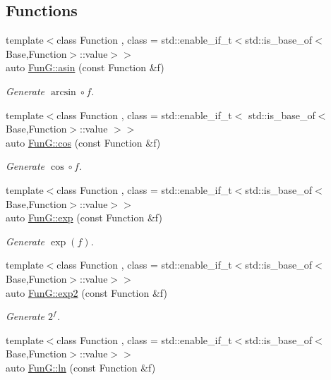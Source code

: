\subsection*{Functions}
\begin{DoxyCompactItemize}
\item 
{\footnotesize template$<$class Function , class  = std\+::enable\+\_\+if\+\_\+t$<$std\+::is\+\_\+base\+\_\+of$<$\+Base,\+Function$>$\+::value$>$$>$ }\\auto \hyperlink{group__CMathGroup_gad26443b289325876cffdaadfca770d51}{Fun\+G\+::asin} (const Function \&f)
\begin{DoxyCompactList}\small\item\em Generate $ \arcsin\circ f $. \end{DoxyCompactList}\item 
{\footnotesize template$<$class Function , class  = std\+::enable\+\_\+if\+\_\+t$<$ std\+::is\+\_\+base\+\_\+of$<$\+Base,\+Function$>$\+::value $>$$>$ }\\auto \hyperlink{group__CMathGroup_ga7e9b2ac717cd2350663293cb66ba6cbd}{Fun\+G\+::cos} (const Function \&f)
\begin{DoxyCompactList}\small\item\em Generate $ \cos\circ f $. \end{DoxyCompactList}\item 
{\footnotesize template$<$class Function , class  = std\+::enable\+\_\+if\+\_\+t$<$std\+::is\+\_\+base\+\_\+of$<$\+Base,\+Function$>$\+::value$>$$>$ }\\auto \hyperlink{group__CMathGroup_ga00135c8521411f13813f9b972ea4e231}{Fun\+G\+::exp} (const Function \&f)
\begin{DoxyCompactList}\small\item\em Generate $ \exp(f) $. \end{DoxyCompactList}\item 
{\footnotesize template$<$class Function , class  = std\+::enable\+\_\+if\+\_\+t$<$std\+::is\+\_\+base\+\_\+of$<$\+Base,\+Function$>$\+::value$>$$>$ }\\auto \hyperlink{group__CMathGroup_ga7724faf7db6e9583ac91df322c26ecf5}{Fun\+G\+::exp2} (const Function \&f)
\begin{DoxyCompactList}\small\item\em Generate $2^f$. \end{DoxyCompactList}\item 
{\footnotesize template$<$class Function , class  = std\+::enable\+\_\+if\+\_\+t$<$std\+::is\+\_\+base\+\_\+of$<$\+Base,\+Function$>$\+::value$>$$>$ }\\auto \hyperlink{group__CMathGroup_ga31313571b08f65b853643e14fc8fc714}{Fun\+G\+::ln} (const Function \&f)

\end{DoxyCompactItemize}

